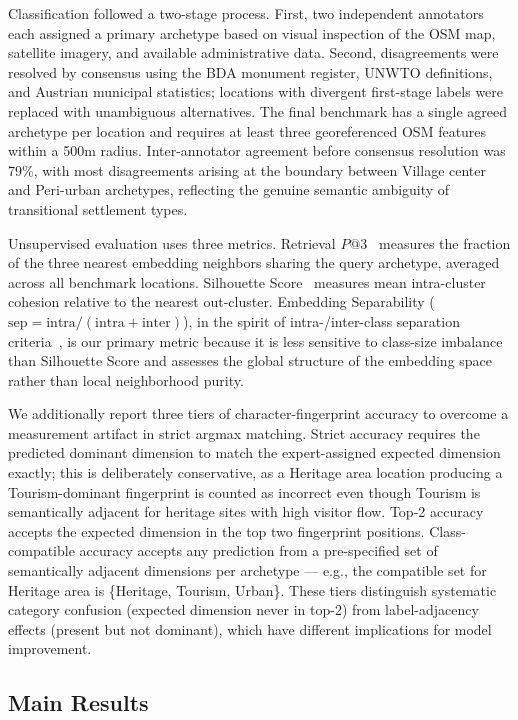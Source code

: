 \documentclass[]{interact}
\theoremstyle{plain}%
\theoremstyle{definition}
\theoremstyle{remark}
\begin{document}
Classification followed a two-stage process. First, two independent annotators each assigned a primary archetype based on visual inspection of the OSM map, satellite imagery, and available administrative data. Second, disagreements were resolved by consensus using the BDA monument register, UNWTO definitions, and Austrian municipal statistics; locations with divergent first-stage labels were replaced with unambiguous alternatives. The final benchmark has a single agreed archetype per location and requires at least three georeferenced OSM features within a 500m radius. Inter-annotator agreement before consensus resolution was 79\%, with most disagreements arising at the boundary between Village center and Peri-urban archetypes, reflecting the genuine semantic ambiguity of transitional settlement types.

Unsupervised evaluation uses three metrics. Retrieval $P@3$~\citep{1394399} measures the fraction of the three nearest embedding neighbors sharing the query archetype, averaged across all benchmark locations. Silhouette Score~\citep{ROUSSEEUW198753} measures mean intra-cluster cohesion relative to the nearest out-cluster. Embedding Separability ($\mathrm{sep} = \mathrm{intra} / (\mathrm{intra} + \mathrm{inter})$), in the spirit of intra-/inter-class separation criteria~\citep{4766909}, is our primary metric because it is less sensitive to class-size imbalance than Silhouette Score and assesses the global structure of the embedding space rather than local neighborhood purity.

We additionally report three tiers of character-fingerprint accuracy to overcome a measurement artifact in strict argmax matching. Strict accuracy requires the predicted dominant dimension to match the expert-assigned expected dimension exactly; this is deliberately conservative, as a Heritage area location producing a Tourism-dominant fingerprint is counted as incorrect even though Tourism is semantically adjacent for heritage sites with high visitor flow. Top-2 accuracy accepts the expected dimension in the top two fingerprint positions. Class-compatible accuracy accepts any prediction from a pre-specified set of semantically adjacent dimensions per archetype --- e.g., the compatible set for Heritage area is \{Heritage, Tourism, Urban\}. These tiers distinguish systematic category confusion (expected dimension never in top-2) from label-adjacency effects (present but not dominant), which have different implications for model improvement.

\subsection{Main Results}
\label{sec:mainresults}
\end{document}
